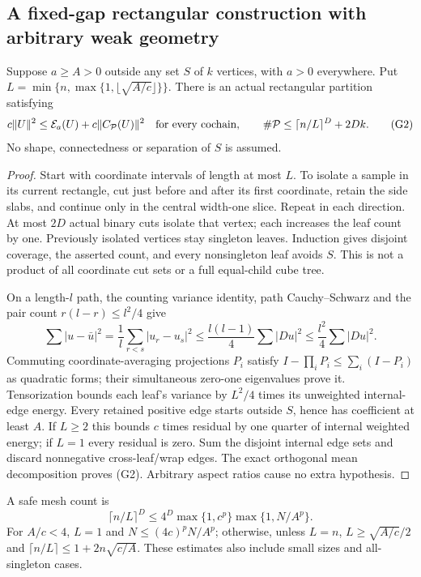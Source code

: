 \subsection{A fixed-gap rectangular construction with arbitrary weak geometry}
\begin{lemma}\label{lem:geo-isolate}
Suppose $a\geq A>0$ outside any set $S$ of $k$ vertices, with $a>0$
everywhere. Put $L=\min\{n,\max\{1,\lfloor\sqrt{A/c}\rfloor\}\}$.
There is an actual rectangular partition satisfying
\[
 c\|U\|^2\leq\mathcal E_a(U)+c\|C_{\mathcal P}(U)\|^2
 \quad\hbox{for every cochain},\qquad
 \#\mathcal P\leq\lceil n/L\rceil^D+2Dk.                  \tag{G2}
\]
No shape, connectedness or separation of $S$ is assumed.
\end{lemma}
\begin{proof}
Start with coordinate intervals of length at most $L$. To isolate a sample
in its current rectangle, cut just before and after its first coordinate,
retain the side slabs, and continue only in the central width-one slice.
Repeat in each direction. At most $2D$ actual binary cuts isolate that
vertex; each increases the leaf count by one. Previously isolated vertices
stay singleton leaves. Induction gives disjoint coverage, the asserted
count, and every nonsingleton leaf avoids $S$. This is not a product of
all coordinate cut sets or a full equal-child cube tree.

On a length-$l$ path, the counting variance identity, path Cauchy--Schwarz
and the pair count $r(l-r)\leq l^2/4$ give
\[
 \sum|u-\bar u|^2=\frac1l\sum_{r<s}|u_r-u_s|^2
 \leq\frac{l(l-1)}4\sum|Du|^2\leq\frac{l^2}4\sum|Du|^2.
\]
Commuting coordinate-averaging projections $P_i$ satisfy
$I-\prod_iP_i\leq\sum_i(I-P_i)$ as quadratic forms; their simultaneous
zero-one eigenvalues prove it. Tensorization bounds each leaf's variance
by $L^2/4$ times its unweighted internal-edge energy. Every retained
positive edge starts outside $S$, hence has coefficient at least $A$.
If $L\geq2$ this bounds $c$ times residual by one quarter of internal
weighted energy; if $L=1$ every residual is zero. Sum the disjoint internal
edge sets and discard nonnegative cross-leaf/wrap edges. The exact
orthogonal mean decomposition proves (G2). Arbitrary aspect ratios cause
no extra hypothesis.
\end{proof}
A safe mesh count is
\[
 \lceil n/L\rceil^D\leq4^D\max\{1,c^p\}\max\{1,N/A^p\}.
\]
For $A/c<4$, $L=1$ and $N\leq(4c)^pN/A^p$; otherwise, unless $L=n$,
$L\geq\sqrt{A/c}/2$ and $\lceil n/L\rceil\leq1+2n\sqrt{c/A}$.
These estimates also include small sizes and all-singleton cases.

